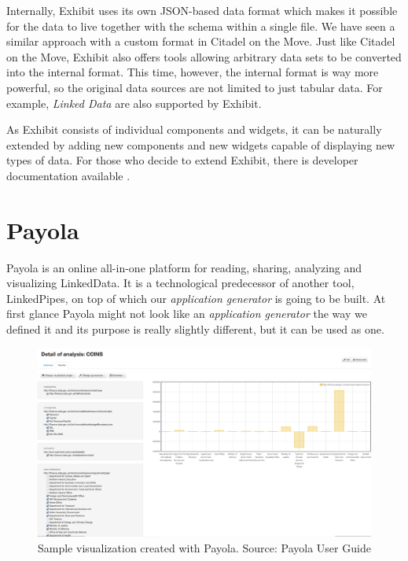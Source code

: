 Internally, Exhibit uses its own JSON-based data format which makes it possible for the data to live together with the schema within a single file. We have seen a similar approach with a custom format in Citadel on the Move. Just like Citadel on the Move, Exhibit also offers tools allowing arbitrary data sets to be converted into the internal format. This time, however, the internal format is way more powerful, so the original data sources are not limited to just tabular data. For example, \emph{Linked Data} are also supported by Exhibit.

As Exhibit consists of individual components and widgets, it can be naturally extended by adding new components and new widgets capable of displaying new types of data. For those who decide to extend Exhibit, there is developer documentation available \cite{exhibit_documentation}.

\section{Payola}

Payola \cite{payola} is an online all-in-one platform for reading, sharing, analyzing and visualizing LinkedData. It is a technological predecessor of another tool, LinkedPipes, on top of which our \emph{application generator} is going to be built. At first glance Payola might not look like an \emph{application generator} the way we defined it and its purpose is really slightly different, but it can be used as one.

\begin{figure}
	\centering
	\includegraphics[width=150mm]{img/02_payola.png}
	\caption{Sample visualization created with Payola. Source: Payola User Guide \cite{payola_user_guide}} 
	\label{fig:payola-example}
\end{figure}


